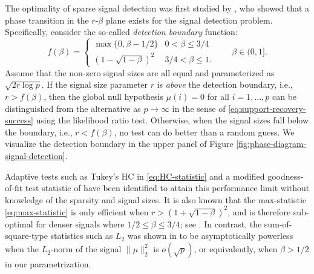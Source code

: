 
The optimality of sparse signal detection was first studied by \citet{ingster1998minimax}, who showed that a phase transition in the $r$-$\beta$ plane exists for the signal detection problem. 
Specifically, consider the so-called {\em detection boundary} function:
\begin{equation} \label{eq:detection-boundary-large-signals}
    f(\beta) = 
    \begin{cases}
        \max\{0,\beta -1/2\} & 0<\beta\le 3/4\\
        \left(1 - \sqrt{1-\beta}\right)^2 & 3/4 < \beta \le 1.
    \end{cases}
    \quad\quad \beta\in (0,1].
\end{equation} 
Assume that the non-zero signal sizes are all equal and parameterized as $\sqrt{2{r}\log{p}}$.
If the signal size parameter $r$ is {\em above} the detection boundary, i.e., $r>f(\beta)$, then the global null 
hypothesis $\mu(i)=0$ for all $i=1,\dots,p$ can be distinguished from the alternative as $p\to\infty$ in the sense of \eqref{eq:support-recovery-success} using the likelihood ratio test.  Otherwise, when the signal sizes fall below the boundary, i.e., $r< f(\beta)$, no test can do better than a 
random guess.  We visualize the detection boundary in the upper panel of Figure
\ref{fig:phase-diagram-signal-detection}.

Adaptive tests such as Tukey's \ac{HC} in \eqref{eq:HC-statistic} \citep{donoho2004higher} and a modified 
goodness-of-fit test statistic of \citet{zhang2002powerful} have been identified to attain this performance limit 
without knowledge of the sparsity and signal sizes. It is also known that the max-statistic \eqref{eq:max-statistic} is only efficient when $r>(1+\sqrt{1-\beta})^2$, and is therefore sub-optimal for denser signals where $1/2\le\beta\le 3/4$; see \cite{cai2011optimal}.  
In contrast, the sum-of-square-type statistics such as $L_2$ was shown in \cite{fan1996test} to be asymptotically powerless when the $L_2$-norm of the signal $\|\mu\|_2^2$ is $o(\sqrt{p})$, or equivalently, when $\beta>1/2$ in our parametrization.

